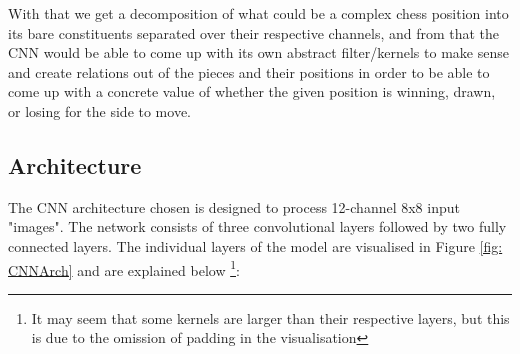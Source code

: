 With that we get a decomposition of what could be a complex chess position into its bare constituents separated over their respective channels, and from that the CNN would be able to come up with its own abstract filter/kernels to make sense and create relations out of the pieces and their positions in order to be able to come up with a concrete value of whether the given position is winning, drawn, or losing for the side to move.

\subsection{Architecture}
\label{Arch}
The CNN architecture chosen is designed to process 12-channel 8x8 input "images". The network consists of three convolutional layers followed by two fully connected layers. The individual layers of the model are visualised in Figure \ref{fig: CNNArch} and are explained below \footnote{It may seem that some kernels are larger than their respective layers, but this is due to the omission of padding in the visualisation}:

\newpage

